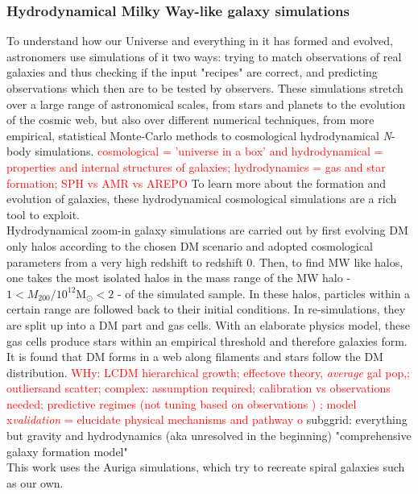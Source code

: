 \subsubsection{Hydrodynamical Milky Way-like galaxy simulations}\label{subsubsec:hydro_sim}
To understand how our Universe and everything in it has formed and evolved, astronomers use simulations of it two ways: trying to match observations of real galaxies and thus checking if the input "recipes" are correct, and predicting observations which then are to be tested by observers. These simulations stretch over a large range of astronomical scales, from stars and planets to the evolution of the cosmic web, but also over different numerical techniques, from more empirical, statistical Monte-Carlo methods to cosmological hydrodynamical \textit{N}-body simulations. \textcolor{red}{cosmological = 'universe in a box' and hydrodynamical = properties and internal structures of galaxies; hydrodynamics = gas and star formation; SPH vs AMR vs AREPO} 
To learn more about the formation and evolution of galaxies, these hydrodynamical cosmological simulations are a rich tool to exploit. 
\\Hydrodynamical zoom-in galaxy simulations are carried out by first evolving \ac{DM} only halos according to the chosen \ac{DM} scenario and adopted cosmological parameters from a very high redshift to redshift 0. Then, to find \ac{MW} like halos, one takes the most isolated halos in the mass range of the \ac{MW} halo - $1 < M_{200} / 10^{12} \mathrm{M}_\odot < 2$ - of the simulated sample. In these halos, particles within a certain range are followed back to their initial conditions. In re-simulations, they are split up into a \ac{DM} part and gas cells. With an elaborate physics model, these gas cells produce stars within an empirical threshold and therefore galaxies form. It is found that \ac{DM} forms in a web along filaments and stars follow the \ac{DM} distribution. 
\textcolor{red}{WHy: LCDM hierarchical growth; effectove theory, \textit{average} gal pop,; outliersand scatter; complex: assumption required; calibration vs observations needed; predictive regimes (not tuning based on observations ) ; model x\textit{validation} = elucidate physical mechanisms and pathway o} subggrid: everything but gravity and hydrodynamics (aka unresolved in the beginning) "comprehensive galaxy formation model"
\\This work uses the Auriga \citep{AurigaGrand} simulations, which try to recreate spiral galaxies such as our own. 
